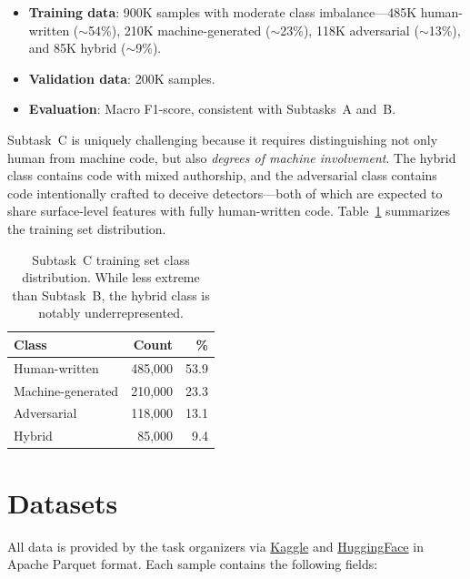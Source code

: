 \documentclass[11pt]{article}
\begin{document}
\begin{itemize}
    \item \textbf{Training data}: 900K samples with moderate class imbalance---485K human-written ($\sim$54\%), 210K machine-generated ($\sim$23\%), 118K adversarial ($\sim$13\%), and 85K hybrid ($\sim$9\%).
    \item \textbf{Validation data}: 200K samples.
    \item \textbf{Evaluation}: Macro F1-score, consistent with Subtasks~A and~B.
\end{itemize}

Subtask~C is uniquely challenging because it requires distinguishing not only human from machine code, but also \textit{degrees of machine involvement}. The hybrid class contains code with mixed authorship, and the adversarial class contains code intentionally crafted to deceive detectors---both of which are expected to share surface-level features with fully human-written code. Table~\ref{tab:taskC_dist} summarizes the training set distribution.

\begin{table}[ht]
\centering
\small
\begin{tabularx}{\columnwidth}{@{}l r r@{}}
\toprule
\textbf{Class} & \textbf{Count} & \textbf{\%} \\ \midrule
Human-written & 485,000 & 53.9 \\
Machine-generated & 210,000 & 23.3 \\
Adversarial & 118,000 & 13.1 \\
Hybrid & 85,000 & 9.4 \\ \bottomrule
\end{tabularx}
\caption{Subtask~C training set class distribution. While less extreme than Subtask~B, the hybrid class is notably underrepresented.}
\label{tab:taskC_dist}
\end{table}

\section{Datasets}
\label{sec:datasets}

All data is provided by the task organizers via \href{https://www.kaggle.com/datasets/daniilor/semeval-2026-task13}{Kaggle} and \href{https://huggingface.co/datasets/DaniilOr/SemEval-2026-Task13}{HuggingFace} in Apache Parquet format. Each sample contains the following fields:
\end{document}
